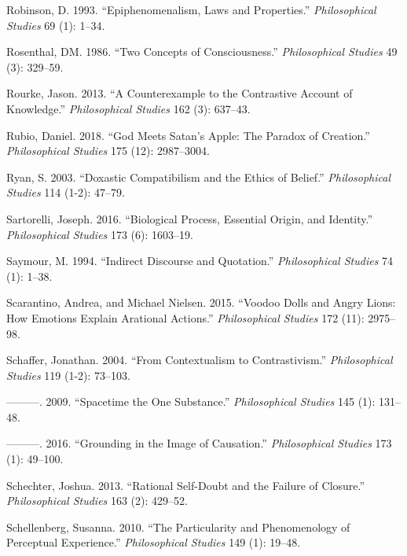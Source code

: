 \documentclass[
  10pt,
  letterpaper,
  DIV=11,
  numbers=noendperiod,
  twoside]{scrartcl}
\newlength{\cslhangindent}
\newenvironment{CSLReferences}[2] %
 {\begin{list}{}{%
  \setlength{\itemindent}{0pt}
  \setlength{\leftmargin}{0pt}
  \setlength{\parsep}{0pt}
  \ifodd #1
   \setlength{\leftmargin}{\cslhangindent}
   \setlength{\itemindent}{-1\cslhangindent}
  \fi
  \setlength{\itemsep}{#2\baselineskip}}}
 {\end{list}}
\begin{document}
\begin{CSLReferences}{1}{0}
Robinson, D. 1993. {``Epiphenomenalism, Laws and Properties.''}
\emph{Philosophical Studies} 69 (1): 1--34.

Rosenthal, DM. 1986. {``Two Concepts of Consciousness.''}
\emph{Philosophical Studies} 49 (3): 329--59.

Rourke, Jason. 2013. {``A Counterexample to the Contrastive Account of
Knowledge.''} \emph{Philosophical Studies} 162 (3): 637--43.

Rubio, Daniel. 2018. {``God Meets Satan's Apple: The Paradox of
Creation.''} \emph{Philosophical Studies} 175 (12): 2987--3004.

Ryan, S. 2003. {``Doxastic Compatibilism and the Ethics of Belief.''}
\emph{Philosophical Studies} 114 (1-2): 47--79.

Sartorelli, Joseph. 2016. {``Biological Process, Essential Origin, and
Identity.''} \emph{Philosophical Studies} 173 (6): 1603--19.

Saymour, M. 1994. {``Indirect Discourse and Quotation.''}
\emph{Philosophical Studies} 74 (1): 1--38.

Scarantino, Andrea, and Michael Nielsen. 2015. {``Voodoo Dolls and Angry
Lions: How Emotions Explain Arational Actions.''} \emph{Philosophical
Studies} 172 (11): 2975--98.

Schaffer, Jonathan. 2004. {``From Contextualism to Contrastivism.''}
\emph{Philosophical Studies} 119 (1-2): 73--103.

---------. 2009. {``Spacetime the One Substance.''} \emph{Philosophical
Studies} 145 (1): 131--48.

---------. 2016. {``Grounding in the Image of Causation.''}
\emph{Philosophical Studies} 173 (1): 49--100.

Schechter, Joshua. 2013. {``Rational Self-Doubt and the Failure of
Closure.''} \emph{Philosophical Studies} 163 (2): 429--52.

Schellenberg, Susanna. 2010. {``The Particularity and Phenomenology of
Perceptual Experience.''} \emph{Philosophical Studies} 149 (1): 19--48.


\end{CSLReferences}
\end{document}
